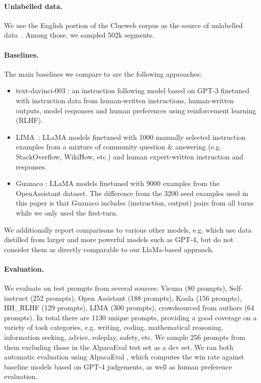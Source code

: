 \paragraph{Unlabelled data.} We use the English portion of  the Clueweb corpus as the source of unlabelled data~\citep{overwijk2022clueweb22}.  Among those, we sampled 502k segments.

\vspace{-2mm}

\paragraph{Baselines.} The main baselines we compare to are the following  approaches: 
\vspace{-2mm}
\begin{itemize}[leftmargin=*]
    \item text-davinci-003 \citep{ouyang2022training}: an instruction following model based on GPT-3 finetuned with instruction data from human-written instructions, human-written outputs, model responses and human preferences using reinforcement learning (RLHF).
    \item LIMA~\citep{zhou2023lima}: LLaMA models finetuned with 1000 manually selected instruction examples from a mixture of community question \& answering (e.g. StackOverflow, WikiHow, etc.) and human expert-written instruction and responses. 
    \item Guanaco \citep{dettmers2023qlora}: LLaMA models finetuned with 9000 examples from the OpenAssistant dataset. The difference from the 3200 seed examples used in this paper is that Guanaco includes (instruction, output) pairs from all turns while we only used the first-turn.
\end{itemize}

We additionally report comparisons to various other models, e.g. which use data distilled from larger and more powerful models such as GPT-4, but do not consider them as directly comparable to our LlaMa-based approach.

\paragraph{Evaluation.} We evaluate on test prompts from several sources: Vicuna \citep{vicuna2023} (80 prompts), Self-instruct \citep{zhang2023self} (252 prompts), Open Assistant \citep{kopf2023openassistant} (188 prompts), Koala \citep{koala_blogpost_2023} (156 prompts), HH\_RLHF \citep{bai2022training} (129 prompts), LIMA \citep{zhou2023lima} (300 prompts), crowdsourced from authors (64 prompts). In total there are 1130 unique prompts, providing a good coverage on a variety of task categories, e.g. writing, coding, mathematical reasoning, information seeking, advice, roleplay, safety, etc. We sample 256 prompts from them excluding those in the AlpacaEval test set as a dev set. We ran both automatic evaluation using AlpacaEval \citep{alpaca_eval}, which computes the win rate against baseline models based on GPT-4 judgements, as well as human preference evaluation. 



